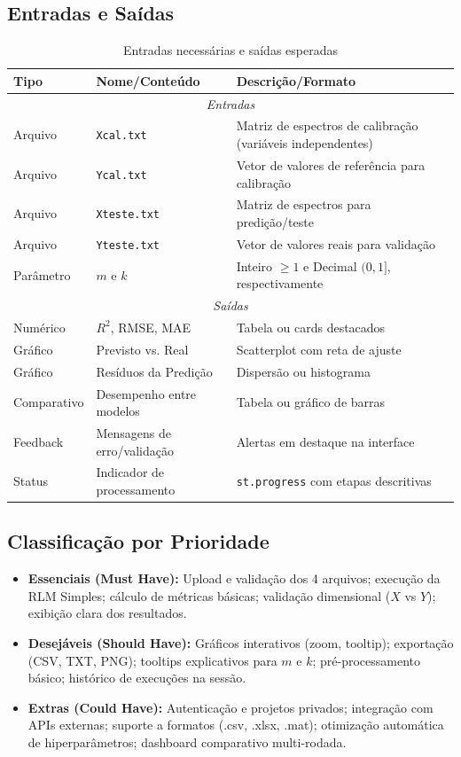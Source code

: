 \documentclass[12pt,a4paper]{article}
\begin{document}
\subsection{Entradas e Saídas}
\begin{table}[H]
\centering
\caption{Entradas necessárias e saídas esperadas}
\begin{tabularx}{\textwidth}{l l X}
\toprule
\textbf{Tipo} & \textbf{Nome/Conteúdo} & \textbf{Descrição/Formato} \\
\midrule
\multicolumn{3}{c}{\textit{Entradas}} \\
Arquivo & \texttt{Xcal.txt} & Matriz de espectros de calibração (variáveis independentes) \\
Arquivo & \texttt{Ycal.txt} & Vetor de valores de referência para calibração \\
Arquivo & \texttt{Xteste.txt} & Matriz de espectros para predição/teste \\
Arquivo & \texttt{Yteste.txt} & Vetor de valores reais para validação \\
Parâmetro & $m$ e $k$ & Inteiro $\ge 1$ e Decimal $(0,1]$, respectivamente \\
\midrule
\multicolumn{3}{c}{\textit{Saídas}} \\
Numérico & $R^2$, RMSE, MAE & Tabela ou cards destacados \\
Gráfico & Previsto vs. Real & Scatterplot com reta de ajuste \\
Gráfico & Resíduos da Predição & Dispersão ou histograma \\
Comparativo & Desempenho entre modelos & Tabela ou gráfico de barras \\
Feedback & Mensagens de erro/validação & Alertas em destaque na interface \\
Status & Indicador de processamento & \texttt{st.progress} com etapas descritivas \\
\bottomrule
\end{tabularx}
\end{table}

\subsection{Classificação por Prioridade}
\begin{itemize}[leftmargin=1.5cm]
    \item \textbf{Essenciais (Must Have):} Upload e validação dos 4 arquivos; execução da RLM Simples; cálculo de métricas básicas; validação dimensional ($X$ vs $Y$); exibição clara dos resultados.
    \item \textbf{Desejáveis (Should Have):} Gráficos interativos (zoom, tooltip); exportação (CSV, TXT, PNG); tooltips explicativos para $m$ e $k$; pré-processamento básico; histórico de execuções na sessão.
    \item \textbf{Extras (Could Have):} Autenticação e projetos privados; integração com APIs externas; suporte a formatos (.csv, .xlsx, .mat); otimização automática de hiperparâmetros; dashboard comparativo multi-rodada.
\end{itemize}
\end{document}
